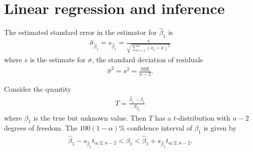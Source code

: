\documentclass{article}
\begin{document}
\section{Linear regression and inference}


\begin{theorem}
	The estimated standard error in the estimator for $\hat\beta_1$ is
	\begin{align*}
		\hat\sigma_{\hat\beta_1}=s_{\hat\beta_1}=\frac{s}{\sqrt{\sum_{i=1}^n (x_i-\overline{x})^2}}
	\end{align*}
	where $s$ is the estimate for $\sigma$, the standard deviation of
	residuals
	\begin{align*}
		\hat\sigma^2 = s^2 = \frac{\text{SSE}}{n-2}.
	\end{align*}
\end{theorem}

\begin{theorem}
	Consider the quantity
	\begin{align*}
		T=\frac{\hat\beta_1-\beta_1}{S_{\hat\beta_1}}
	\end{align*}
	where $\beta_1$ is the true but unknown value. Then $T$
	has a $t$-distribution with $n-2$ degrees of freedom.
	The $100(1-\alpha)\%$ confidence interval of $\beta_1$ is given by
	\begin{align*}
		\hat\beta_1 - s_{\hat\beta_1}t_{\alpha/2,n-2} <\beta_1
		<\hat\beta_1+s_{\hat\beta_1}t_{\alpha/2,n-2}.
	\end{align*}
\end{theorem}
\end{document}
